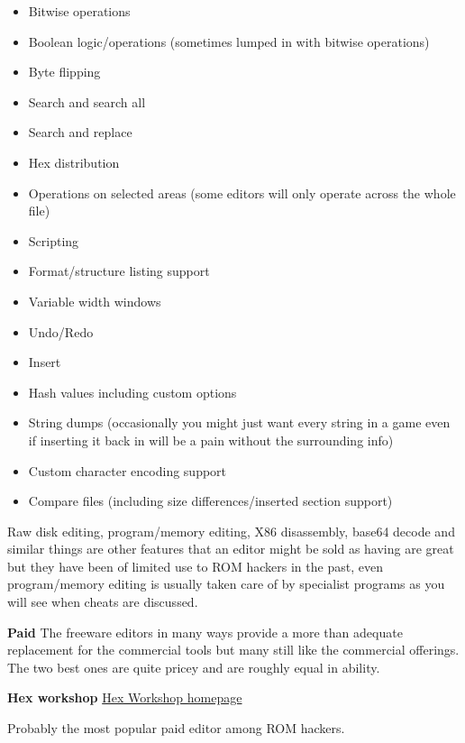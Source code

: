 \documentclass[
]{book}
\providecommand{\tightlist}{%
  \setlength{\itemsep}{0pt}\setlength{\parskip}{0pt}}
\begin{document}
\begin{itemize}
\tightlist
\item
  Bitwise operations
\item
  Boolean logic/operations (sometimes lumped in with bitwise operations)
\item
  Byte flipping
\item
  Search and search all
\item
  Search and replace
\item
  Hex distribution
\item
  Operations on selected areas (some editors will only operate across the whole file)
\item
  Scripting
\item
  Format/structure listing support
\item
  Variable width windows
\item
  Undo/Redo
\item
  Insert
\item
  Hash values including custom options
\item
  String dumps (occasionally you might just want every string in a game even if inserting it back in will be a pain without the surrounding info)
\item
  Custom character encoding support
\item
  Compare files (including size differences/inserted section support)
\end{itemize}

Raw disk editing, program/memory editing, X86 disassembly, base64 decode and similar things are other features that an editor might be sold as having are great but they have been of limited use to ROM hackers in the past, even program/memory editing is usually taken care of by specialist programs as you will see when cheats are discussed.

\textbf{Paid} The freeware editors in many ways provide a more than adequate replacement for the commercial tools but many still like the commercial offerings. The two best ones are quite pricey and are roughly equal in ability.

\textbf{Hex workshop} \href{http://www.hexworkshop.com/}{Hex Workshop homepage}

Probably the most popular paid editor among ROM hackers.
\end{document}
